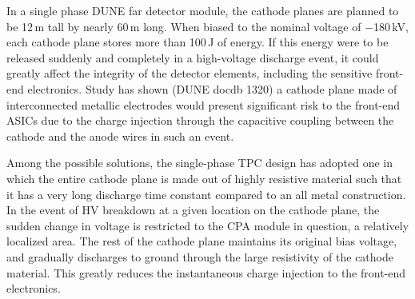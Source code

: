 In a single phase DUNE far detector module, the cathode planes are planned to be 12\,m tall by nearly 60\,m long.  When biased to the nominal voltage of $-$180\,kV, each cathode plane stores more than 100\,J of energy. If this energy were to be released  suddenly and completely in a high-voltage discharge event, it could greatly affect the integrity of the detector elements, including the sensitive front-end electronics.  
Study has shown (DUNE docdb 1320)  a cathode plane made of interconnected metallic electrodes would present significant risk to the front-end ASICs due to the charge injection through the capacitive coupling between the cathode and the anode wires in such an event.  




Among the possible solutions, the single-phase TPC design has adopted one in which the entire cathode plane is made out of highly resistive material such that it has a very long discharge time constant compared to an all metal construction.  In the event of HV breakdown at a given location on the cathode plane, the sudden change in voltage is restricted to the CPA module in question,  a relatively localized area.  The rest of the cathode plane maintains its original bias voltage, and gradually discharges to ground through the large resistivity of the cathode material.  This greatly reduces the instantaneous charge injection to the front-end electronics.


